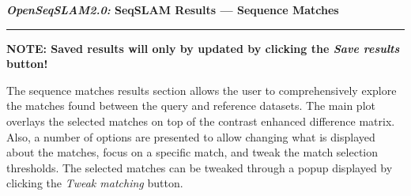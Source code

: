 \centerline{\textbf{\textit{OpenSeqSLAM2.0:} SeqSLAM Results --- Sequence Matches}}
\noindent\rule{\textwidth}{2pt}
\centerline{\textbf{NOTE: Saved results will only by updated by clicking the \textit{Save results} button!}}
\bigskip
\parbox{\textwidth}{The sequence matches results section allows the user to comprehensively explore the matches found between the query and reference datasets. The main plot overlays the selected matches on top of the contrast enhanced difference matrix. Also, a number of options are presented to allow changing what is displayed about the matches, focus on a specific match, and tweak the match selection thresholds. The selected matches can be tweaked through a popup displayed by clicking the \textit{Tweak matching} button.}
\bigskip
